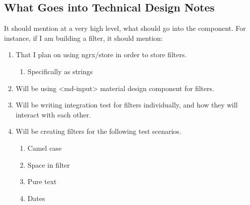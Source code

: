 \subsection{ What Goes into Technical Design Notes }
It should mention at a very high level, what should go into the component. For
instance, if I am building a filter, it should mention:
\begin{enumerate}
  \item That I plan on using ngrx/store in order to store filters.
    \begin{enumerate}
      \item Specifically as strings
    \end{enumerate}
  \item Will be using <md-input> material design component for filters.
  \item Will be writing integration test for filters individually, and how they
  will interact with each other.
  \item Will be creating filters for the following test scenarios.
    \begin{enumerate}
      \item Camel case
      \item Space in filter
      \item Pure text
      \item Dates
    \end{enumerate}
\end{enumerate}
